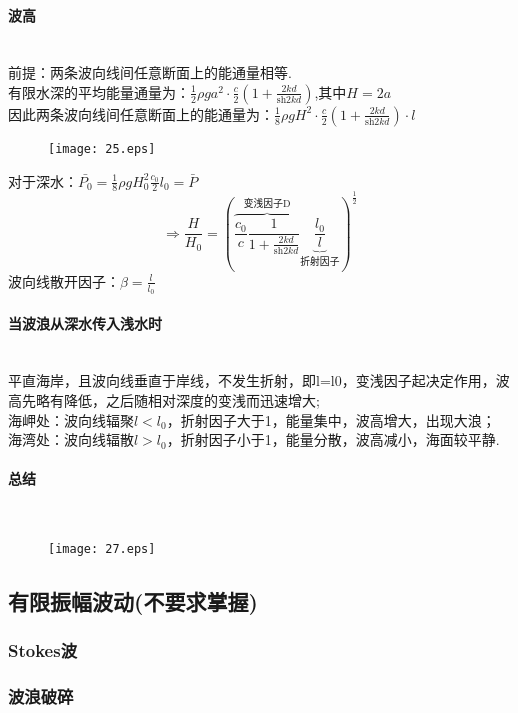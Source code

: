 \documentclass[a4paper,12pt]{article}
\begin{document}
    \paragraph{波高}~{}\\
    前提：两条波向线间任意断面上的能通量相等.\\
    有限水深的平均能量通量为：$\displaystyle \frac{1}{2}\rho g a^2\cdot \frac{c}{2}\left(1+\frac{2kd}{\mathrm{sh} 2kd}\right)$,其中$H=2a$\\
    因此两条波向线间任意断面上的能通量为：$\displaystyle \frac{1}{8}\rho g H^2\cdot \frac{c}{2}\left(1+\frac{2kd}{\mathrm{sh} 2kd}\right)\cdot l$
    \begin{figure}[H]
        \centering \texttt{[image: 25.eps]}
        \caption*{}
    \end{figure}
    对于深水：$\displaystyle \bar{P_0}=\frac{1}{8}\rho g H_0^2\frac{c_0}{2}l_0=\bar{P}$
    \[
        \Rightarrow \frac{H}{H_0}=\left(\overbrace{\frac{c_0}{c}\frac{1}{1+\frac{2kd}{\mathrm{sh}2kd}}}^{\mbox{变浅因子D}}\underbrace{\frac{l_0}{l}}_{\mbox{折射因子}}\right)^{\frac{1}{2}}
    \]
    波向线散开因子：$\displaystyle \beta=\frac{l}{l_0}$
    \paragraph{当波浪从深水传入浅水时}~{}\\
    平直海岸，且波向线垂直于岸线，不发生折射，即l=l0，变浅因子起决定作用，波高先略有降低，之后随相对深度的变浅而迅速增大;\\
    海岬处：波向线辐聚$l<l_0$，折射因子大于1，能量集中，波高增大，出现大浪；\\
    海湾处：波向线辐散$l>l_0$，折射因子小于1，能量分散，波高减小，海面较平静.
    \newpage
    \paragraph{总结}~{}
    \begin{figure}[H]
        \centering \texttt{[image: 27.eps]}
        \caption*{}
    \end{figure}
    \subsection{有限振幅波动(不要求掌握)}
    \subsubsection{Stokes波}
    \subsubsection{波浪破碎}
\end{document}
